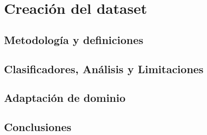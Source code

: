 \documentclass[11pt,a4paper,twoside]{tesis}
\begin{document}
\part{Creación del dataset}

\chapter{Metodología y definiciones}


\chapter{Clasificadores, Análisis y Limitaciones}


\chapter{Adaptación de dominio}


\chapter{Conclusiones}


\appendix






\backmatter

\end{document}
